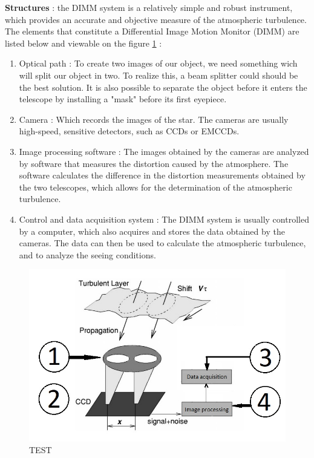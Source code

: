 \bigbreak
\textbf{Structures} : \newline the DIMM system is a relatively simple and robust instrument, which provides an accurate and objective measure of the atmospheric turbulence. 
The elements that constitute a Differential Image Motion Monitor (DIMM) are listed below and viewable on the figure 
\ref{fig:DIMM_Schematic} :
\begin{enumerate}
    \item Optical path : To create two images of our object, we need something wich will split our object in two. To realize this, a beam splitter could 
    should be the best solution. It is also possible to separate the object before it enters the telescope by installing a "mask" before its first 
    eyepiece.
    \item Camera : Which records the images of the star. The cameras are usually high-speed, sensitive detectors, such as CCDs or EMCCDs.
    \item Image processing software : The images obtained by the cameras are analyzed by software that measures the distortion caused by the atmosphere. 
    The software calculates the difference in the distortion measurements obtained by the two telescopes, which allows for the determination of the 
    atmospheric turbulence.
    \item Control and data acquisition system : The DIMM system is usually controlled by a computer, which also acquires and stores the data obtained by 
    the cameras. The data can then be used to calculate the atmospheric turbulence, and to analyze the seeing conditions.
\end{enumerate}
\begin{figure}[H]
    \centering
    \includegraphics{assets/figures/Theory/DIMM_Schematic.jpg}
    \caption{TEST}
    \label{fig:DIMM_Schematic}
\end{figure}
